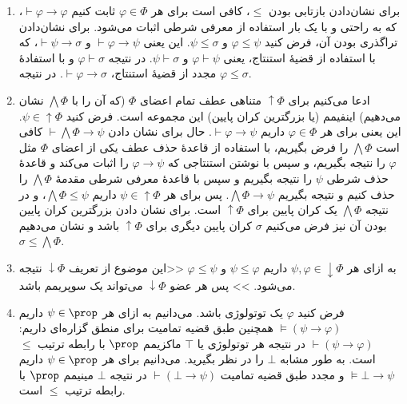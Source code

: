 \begin{ans}
    \begin{enumerate}[label=(\alph*)]
        \item\label{q60:a} برای نشان‌دادن بازتابی بودن $\leq$، کافی است برای هر $\varphi \in \Phi$ ثابت کنیم $\vdash \varphi \rightarrow \varphi$، که به راحتی و با یک بار استفاده از معرفی شرطی اثبات می‌شود.
        برای نشان‌دادن تراگذری بودن آن، فرض کنید
        $\varphi\leq\psi$
        و
        $\psi\leq\sigma$.
        این یعنی
        $\vdash\varphi\to\psi$
        و
        $\vdash\psi\to\sigma$، که با استفاده از قضیهٔ استنتاج، یعنی $\varphi\vdash\psi$ و $\psi\vdash\sigma$. در نتیجه $\varphi\vdash\sigma$ و با استفادهٔ مجدد از قضیهٔ استنتاج، $\vdash\varphi\rightarrow\sigma$. در نتیجه $\varphi\leq\sigma$.
        
        \item\label{q60:b} ادعا می‌کنیم برای
        $\uparrow\Phi$
        متناهی عطف تمام اعضای
        $\Phi$
        (که آن را با
        $\bigwedge\Phi$
        نشان می‌دهیم)
        اینفیمم (یا بزرگترین کران پایین) این مجموعه است.
        فرض کنید
        $\psi\in\uparrow\Phi$.
        این یعنی برای هر
        $\varphi\in\Phi$
        داریم
        $\vdash\varphi\to\psi$.
        حال برای نشان دادن
        $\vdash\bigwedge\Phi\to\psi$
        کافی است
        $\bigwedge\Phi$
        را فرض بگیریم، با استفاده از قاعدهٔ حذف عطف یکی از اعضای
        $\Phi$
        مثل
        $\varphi$
        را نتیجه بگیریم، و سپس با نوشتن استنتاجی که
        $\varphi\to\psi$
        را اثبات می‌کند و قاعدهٔ حذف شرطی
        $\psi$
        را نتیجه بگیریم و سپس با قاعدهٔ معرفی شرطی مقدمهٔ
        $\bigwedge\Phi$
        را حذف کنیم و نتیجه بگیریم
        $\bigwedge\Phi\to\psi$. پس برای هر ‌$\psi\in\uparrow\Phi$ داریم $\bigwedge\Phi\leq\psi$، و در نتیجه $\bigwedge\Phi$ یک کران پایین برای $\uparrow\Phi$ است. برای نشان دادن بزرگترین کران پایین بودن آن نیز فرض می‌کنیم $\sigma$ کران پایین دیگری برای $\uparrow\Phi$ باشد و نشان می‌دهیم $\sigma\leq\bigwedge\Phi$.
        
        \item\label{q60:c} 
        به ازای هر 
        $\psi,\varphi\in\downarrow\Phi$
        داریم
        $\psi\leq\varphi$
        و
        $\varphi\leq\psi$
        <<این موضوع از تعریف 
        $\downarrow\Phi$
        نتیجه می‌شود. >>
        پس هر عضو 
        $\downarrow\Phi$
        می‌تواند یک سوپریمم باشد.
        
        \item\label{q60:d}  
        فرض کنید 
        $\varphi$
        یک توتولوژی باشد. 
        می‌دانیم به ازای هر 
        $\psi\in\prop$
        داریم
        $\models(\psi\to\varphi)$
        همچنین طبق قضیه تمامیت برای منطق گزاره‌ای داریم:
        $\vdash(\psi\to\varphi)$
        در نتیجه هر توتولوژی یا
        $\top$
        ماکزیمم 
        $\prop$
        با رابطه ترتیب 
        $\leq$
        است.
        به طور مشابه 
        $\bot$
        را در نظر بگیرید. 
        می‌دانیم برای هر 
        $\psi\in\prop$
        داریم 
        $\models\bot\to\psi$
        و مجدد طبق قضیه تمامیت
        $\vdash(\bot\to\psi)$
        در نتیجه 
        $\bot$
        مینیمم 
        $\prop$
        با رابطه ترتیب
        $\leq$
        است.


\end{enumerate}
\end{ans}
